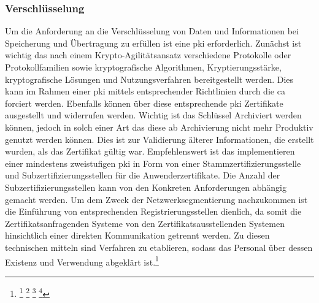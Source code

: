 \documentclass[11pt,a4paper,hidelinks]{article}   %
\begin{document}
            \subsubsection{Verschlüsselung}
            Um die Anforderung an die Verschlüsselung von Daten und Informationen bei Speicherung und Übertragung zu erfüllen ist eine \gls{pki} erforderlich. Zunächst ist wichtig das nach einem Krypto-Agilitätsansatz verschiedene Protokolle oder Protokollfamilien sowie kryptografische Algorithmen, Kryptierungsstärke, kryptografische Lösungen und Nutzungsverfahren bereitgestellt werden. Dies kann im Rahmen einer \gls{pki} mittels entsprechender Richtlinien durch die \gls{ca} forciert werden. Ebenfalls können über diese entsprechende \gls{pki} Zertifikate ausgestellt und widerrufen werden. Wichtig ist das Schlüssel Archiviert werden können, jedoch in solch einer Art das diese ab Archivierung nicht mehr Produktiv genutzt werden können. Dies ist zur Validierung älterer Informationen, die erstellt wurden, als das Zertifikat gültig war. Empfehlenswert ist das implementieren einer mindestens zweistufigen \gls{pki} in Form von einer Stammzertifizierungsstelle und Subzertifizierungsstellen für die Anwenderzertifikate. Die Anzahl der Subzertifizierungsstellen kann von den Konkreten Anforderungen abhängig gemacht werden. Um dem Zweck der Netzwerksegmentierung nachzukommen ist die Einführung von entsprechenden Registrierungsstellen dienlich, da somit die Zertifikatsanfragenden Systeme von den Zertifikatsausstellenden Systemen hinsichtlich einer direkten Kommunikation getrennt werden. Zu diesen technischen mitteln sind Verfahren zu etablieren, sodass das Personal über dessen Existenz und Verwendung abgeklärt ist.\footnote{
                \footcite[Vgl.][, S. 216 - 218]{9781498707480}
                \footcite[Vgl.][, S. 63 - 70]{9781907117046}
                \footcite[Vgl.][, S. 23 - 28 \& 47 - 50]{9780815396413}
                \footcite[Vgl.][, S. 293 \& 302]{9780763791285}
            }
\end{document}
